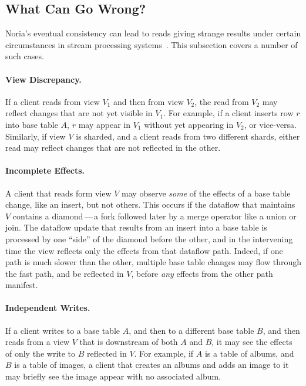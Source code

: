 \subsection{What Can Go Wrong?}

Noria's eventual consistency can lead to reads giving strange results under
certain circumstances in stream processing systems~\cite{materialize-eventual}.
This subsection covers a number of such cases.

\paragraph{View Discrepancy.}
If a client reads from view $V_1$ and then from view $V_2$, the read from $V_2$
may reflect changes that are not yet visible in $V_1$. For example, if a client
inserts row $r$ into base table $A$, $r$ may appear in $V_1$ without yet
appearing in $V_2$, or vice-versa. Similarly, if view $V$ is sharded, and a
client reads from two different shards, either read may reflect changes that are
not reflected in the other.

\paragraph{Incomplete Effects.}
A client that reads form view $V$ may observe \emph{some} of the effects of a
base table change, like an insert, but not others. This occurs if the dataflow
that maintains $V$ contains a diamond\,---\,a fork followed later by a merge
operator like a union or join. The dataflow update that results from an insert
into a base table is processed by one ``side'' of the diamond before the other,
and in the intervening time the view reflects only the effects from that
dataflow path. Indeed, if one path is much slower than the other, multiple base
table changes may flow through the fast path, and be reflected in $V$, before
\emph{any} effects from the other path manifest.

\paragraph{Independent Writes.}
If a client writes to a base table $A$, and then to a different base table $B$,
and then reads from a view $V$ that is downstream of both $A$ and $B$, it may
see the effects of only the write to $B$ reflected in $V$. For example, if $A$
is a table of albums, and $B$ is a table of images, a client that creates an
albums and adds an image to it may briefly see the image appear with no
associated album.

